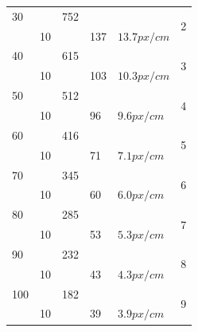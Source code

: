 \begin{appendix}
\begin{table}[h]
\begin{center}
\begin{tabular}[]{| l | l | l | l | l | l |}
                    30      &            & 752   &                &              & \multirow{2}{1cm}{2} \\
                            & 10         &       & 137            & $13.7 px/cm$ & \\
                    \hline

                    40      &            & 615   &                &              & \multirow{2}{1cm}{3} \\
                            & 10         &       & 103            & $10.3 px/cm$ & \\
                    \hline

                    50      &            & 512   &                &              & \multirow{2}{1cm}{4} \\
                            & 10         &       & 96             & $9.6 px/cm$  & \\
                    \hline

                    60      &            & 416   &                &              & \multirow{2}{1cm}{5} \\
                            & 10         &       & 71             & $7.1 px/cm$  & \\
                    \hline

                    70      &            & 345   &                &              & \multirow{2}{1cm}{6} \\
                            & 10         &       & 60             & $6.0 px/cm$  & \\
                    \hline

                    80      &            & 285   &                &              & \multirow{2}{1cm}{7} \\
                            & 10         &       & 53             & $5.3 px/cm$  & \\
                    \hline

                    90      &            & 232   &                &              & \multirow{2}{1cm}{8} \\
                            & 10         &       & 43             & $4.3 px/cm$  & \\
                    \hline

                    100     &            & 182   &                &              & \multirow{2}{1cm}{9} \\
                            & 10         &       & 39             & $3.9 px/cm$  & \\
                    \hline


\end{tabular}
\end{center}
\end{table}
\end{appendix}
